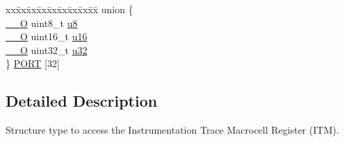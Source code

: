 \begin{DoxyCompactItemize}
\begin{tabbing}
\end{tabbing}\item 
\begin{tabbing}
xx\=xx\=xx\=xx\=xx\=xx\=xx\=xx\=xx\=\kill
union \{\\
\>\hyperlink{group___c_m_s_i_s__core__definitions_ga7e25d9380f9ef903923964322e71f2f6}{\_\_O} uint8\_t \hyperlink{struct_i_t_m___type_abea77b06775d325e5f6f46203f582433}{u8}\\
\>\hyperlink{group___c_m_s_i_s__core__definitions_ga7e25d9380f9ef903923964322e71f2f6}{\_\_O} uint16\_t \hyperlink{struct_i_t_m___type_a12aa4eb4d9dcb589a5d953c836f4e8f4}{u16}\\
\>\hyperlink{group___c_m_s_i_s__core__definitions_ga7e25d9380f9ef903923964322e71f2f6}{\_\_O} uint32\_t \hyperlink{struct_i_t_m___type_a6882fa5af67ef5c5dfb433b3b68939df}{u32}\\
\} \hyperlink{struct_i_t_m___type_a98d0116d15de5f5633d34fdf594b853e}{PORT} \mbox{[}32\mbox{]}\\

\end{tabbing}\end{DoxyCompactItemize}


\subsection{Detailed Description}
Structure type to access the Instrumentation Trace Macrocell Register (I\-T\-M). 

